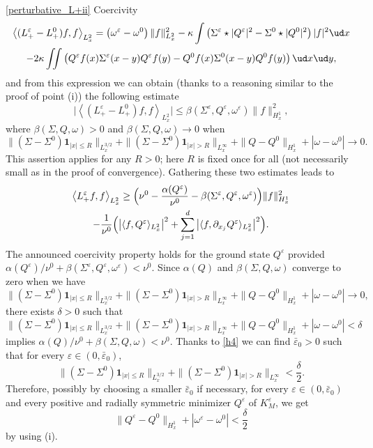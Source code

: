 \begin{ProofOf}{\eqref{perturbative_L+ii} Coercivity}
\begin{multline*}
\left\langle(L_{+}^{\varepsilon}-L_{+}^{0})f,f\right\rangle_{L_{x}^{2}}=\left(\omega^{\varepsilon}-\omega^{0}\right)\|f\|_{L_{x}^{2}}^{2}-\kappa\int\left(\Sigma^{\varepsilon}\star|Q^{\varepsilon}|^{2}-\Sigma^{0}\star|Q^{0}|^{2}\right)|f|^{2}\ud x\\
-2\kappa\iint\left(Q^{\varepsilon}f(x)\Sigma^{\varepsilon}(x-y)Q^{\varepsilon}f(y)-Q^{0}f(x)\Sigma^{0}(x-y)Q^{0}f(y)\right)\ud x\ud y,
\end{multline*}
and from this expression we can obtain (thanks to a reasoning similar to the proof of point (i)) the following estimate
\[
\bigl|\left\langle(L_{+}^{\varepsilon}-L_{+}^{0})f,f\right\rangle_{L_{x}^{2}}\bigr|\leq\beta(\Sigma^{\varepsilon},Q^{\varepsilon},\omega^{\varepsilon})\|f\|_{H_{x}^{1}}^{2},
\]
where $\beta(\Sigma,Q,\omega)>0$ and $\beta(\Sigma,Q,\omega)\to 0$ when
\[
\|(\Sigma-\Sigma^{0})\mathbf{1}_{|x|\leq R}\|_{L_{x}^{3/2}}+\|(\Sigma-\Sigma^{0})\mathbf{1}_{|x|> R}\|_{L_{x}^{\infty}}+\|Q-Q^{0}\|_{H_{x}^{1}}+|\omega-\omega^{0}|\to 0.
\]
This assertion applies for any $R>0$;
here $R$ is fixed once for all (not necessarily small as in the proof of convergence).
Gathering these two estimates leads to\vspace*{-5pt}
\begin{multline*}
\left\langle L_{+}^{\varepsilon}f,f\right\rangle_{L_{x}^{2}}\geq
\Bigl(\nu^{0}-\frac{\alpha(Q^{\varepsilon})}{\nu^{0}}-\beta(\Sigma^{\varepsilon},Q^{\varepsilon},\omega^{\varepsilon})\Bigr)\|f\|_{H_{x}^{1}}^{2}\\
-\frac{1}{\nu^{0}}\Bigl(\left|\langle f,Q^{\varepsilon}\rangle_{L_{x}^{2}}\right|^{2}+\sum\limits_{j=1}^{d}\left|\langle f,\partial_{x_{j}}Q^{\varepsilon}\rangle_{L_{x}^{2}}\right|^{2}\Bigr).
\end{multline*}
The announced coercivity property holds for the ground state $Q^{\varepsilon}$ provided $\alpha(Q^{\varepsilon})/\nu^{0}+\beta(\Sigma^{\varepsilon},Q^{\varepsilon},\omega^{\varepsilon})<\nu^{0}$. Since $\alpha(Q)$ and $\beta(\Sigma,Q,\omega)$ converge to zero when we have
\[
\|(\Sigma-\Sigma^{0})\mathbf{1}_{|x|\leq R}\|_{L_{x}^{3/2}}+\|(\Sigma-\Sigma^{0})\mathbf{1}_{|x|> R}\|_{L_{x}^{\infty}}+\|Q-Q^{0}\|_{H_{x}^{1}}+|\omega-\omega^{0}|\to 0,
\]
there exists $\delta>0$ such that
\[
\|(\Sigma-\Sigma^{0})\mathbf{1}_{|x|\leq R}\|_{L_{x}^{3/2}}+\|(\Sigma-\Sigma^{0})\mathbf{1}_{|x|> R}\|_{L_{x}^{\infty}}+\|Q-Q^{0}\|_{H_{x}^{1}}+|\omega-\omega^{0}|<\delta
\]
implies $\alpha(Q)/\nu^{0}+\beta(\Sigma,Q,\omega)<\nu^{0}$. Thanks to \eqref{h4} we can find $\bar{\varepsilon}_{0}>0$ such that for every $\varepsilon\in(0,\bar{\varepsilon}_{0})$,
\[
\|(\Sigma-\Sigma^{0})\mathbf{1}_{|x|\leq R}\|_{L_{x}^{3/2}}+\|(\Sigma-\Sigma^{0})\mathbf{1}_{|x|> R}\|_{L_{x}^{\infty}}<\frac{\delta}{2}.
\]
Therefore, possibly by choosing a smaller $\bar{\varepsilon}_{0}$ if necessary, for every $\varepsilon\in(0,\bar{\varepsilon}_{0})$ and every positive and radially symmetric minimizer $Q^{\varepsilon}$ of $K_{M}^{\varepsilon}$, we get
\[
\|Q^{\varepsilon}-Q^{0}\|_{H_{x}^{1}}+|\omega^{\varepsilon}-\omega^{0}|<\frac{\delta}{2}
\]
by using (i).
\end{ProofOf}

